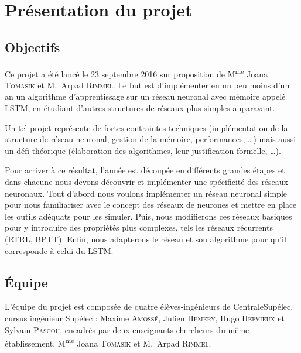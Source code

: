 
\chapter{Présentation du projet}

\section{Objectifs}

Ce projet a été lancé le 23 septembre 2016 sur proposition de M\textsuperscript{me} Joana \textsc{Tomasik}
et M.\ Arpad \textsc{Rimmel}. Le but est d'implémenter en un peu moins d'un an un algorithme d'apprentissage sur un réseau neuronal avec mémoire appelé LSTM\footnotemark, en étudiant d'autres structures de réseaux plus simples auparavant.


\bigskip

Un tel projet représente de fortes contraintes techniques (implémentation de la structure de
 réseau neuronal, gestion de la mémoire, performances, \ldots) mais aussi un défi
 théorique (élaboration des algorithmes, leur justification formelle, \ldots).

\bigskip

Pour arriver à ce résultat, l'année est découpée en différents grandes étapes et dans
chacune nous devons découvrir et implémenter une spécificité des réseaux
neuronaux.
Tout d'abord nous voulons implémenter un réseau neuronal simple pour
nous familiariser avec le concept des réseaux de neurones et mettre en place
les outils adéquats pour les simuler. Puis, nous modifierons ces réseaux
basiques pour y introduire des propriétés plus complexes, tels les réseaux
récurrents (RTRL, BPTT). Enfin, nous adapterons le réseau et son algorithme pour
qu'il corresponde à celui du LSTM.

\section{Équipe}

L'équipe du projet est composée de quatre élèves-ingénieurs de CentraleSupélec, cursus ingénieur Supélec :
Maxime \textsc{Amossé}, Julien \textsc{Hemery}, Hugo \textsc{Hervieux} et Sylvain \textsc{Pascou}, encadrés par deux
enseignants-chercheurs du même établissement, M\textsuperscript{me} Joana \textsc{Tomasik} et M.\ Arpad
\textsc{Rimmel}.

